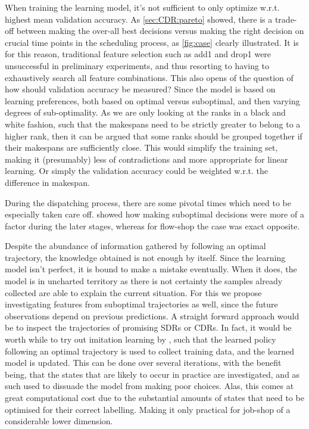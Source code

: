 \documentclass[smallextended]{svjour3}
\begin{document}
When training the learning model, it's not sufficient to only optimize w.r.t. 
highest mean validation accuracy. As \cref{sec:CDR:pareto} showed, there is a 
trade-off between making the over-all best decisions versus making the right 
decision on crucial time points in the scheduling process, as \cref{fig:case} 
clearly illustrated. It is for this reason, traditional feature selection such 
as add1 and drop1 were unsuccessful in preliminary experiments, and thus 
resorting to having to exhaustively search all feature combinations.
This also opens of the question of how should validation accuracy be measured? 
Since the model is based on learning preferences, both based on optimal versus 
suboptimal, and then varying degrees of sub-optimality. As we are only looking 
at the ranks in a black and white fashion, such that the makespans need to be 
strictly greater to belong to a higher rank, then it can be argued that some 
ranks should be grouped together if their makespans are sufficiently close. 
This would simplify the training set, making it (presumably) less of 
contradictions and more appropriate for linear learning. Or simply the 
validation accuracy could be weighted w.r.t. the  difference in 
makespan.

During the dispatching process, there are some pivotal times which need to be 
especially taken care off.  showed how making suboptimal 
decisions were more of a factor during the later stages, whereas for flow-shop 
the case was exact opposite. 

Despite the abundance of information gathered by following an optimal 
trajectory, the knowledge obtained is not enough by itself. Since the learning 
model isn't perfect, it is bound to make a mistake eventually. When it does, 
the model is in uncharted  territory as there is not certainty the samples 
already collected are able to explain the current situation. For this we 
propose investigating features from suboptimal trajectories as well, since the 
future observations depend on previous predictions. 
 A straight forward approach would be to inspect 
the trajectories of promising SDRs or CDRs. 
In fact, it would be worth while to try out imitation learning by 
\cite{RossB10,RossGB11}, such that the learned policy following an optimal 
trajectory is used to collect training data, and the learned model is updated. 
This can be done over several iterations, with the benefit being, that the 
states that are likely to occur in practice are investigated, and as such used 
to dissuade the model from making poor choices. Alas, this comes at great 
computational cost due to the substantial amounts of states that need to be 
optimised for their correct labelling. Making it only practical for job-shop of 
a considerable lower dimension. 
\end{document}
